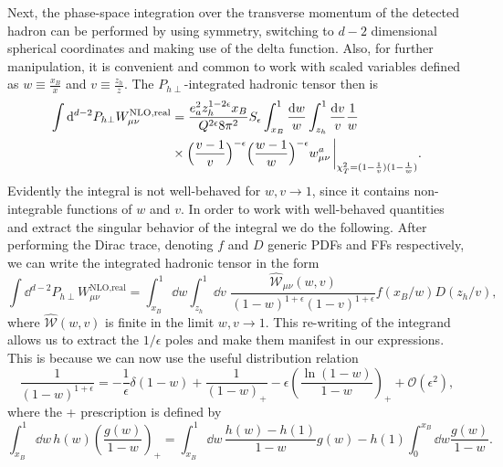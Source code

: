 Next, the phase-space integration over the transverse momentum of the detected hadron can be performed by using symmetry, switching to $d-2$ dimensional spherical coordinates and making use of the delta function. Also, for further manipulation, it is convenient and common to work with scaled variables defined as $w\equiv\frac{x_B}{x}$ and $ v\equiv\frac{z_h}{z}$. The $P_{h\perp}$-integrated hadronic tensor then is
\begin{equation}
    \begin{aligned}
         \int \dd^{d-2}P_{h\perp} W_{\mu\nu}^{\text{NLO,real}}&=\frac{e_a^2z_h^{1-2\epsilon} x_B}{Q^{2\epsilon}8\pi^2}S_\epsilon    \int_{x_B}^{1} \frac{\dd w}{w}\int_{z_h}^{1}  \frac{\dd v}{v}\frac{1}{w}\\
         &\times\Big(\frac{v-1}{v} \Big)^{-\epsilon}\Big(\frac{w-1}{w}\Big)^{-\epsilon}w_{\mu\nu}^a\eval_{\chi_T^2=(1-\frac{1}{v})(1-\frac{1}{w})}  .
    \end{aligned}
\end{equation}
Evidently the integral is not well-behaved for $w,v\to 1$, since it contains non-integrable functions of $w$ and $v$. In order to work with well-behaved quantities and extract the singular behavior of the integral we do the following. After performing the Dirac trace, denoting $f$ and $D$ generic PDFs and FFs respectively, we can write the integrated hadronic tensor in the form
\begin{equation}
    \int \dd^{d-2}P_{h\perp} W_{\mu\nu}^{\text{NLO,real}}= \int_{x_B}^{1} \dd w\int_{z_h}^{1} \dd v \,\,\frac{\hat{\mathcal{W}}_{\mu\nu}(w,v)}{(1-w)^{1+\epsilon}(1-v)^{1+\epsilon}}f(x_B/w)D(z_h/v),
\end{equation}
where $\hat{\mathcal{W}}(w,v)$ is finite in the limit $w,v\to 1$. This re-writing of the integrand allows us to extract the $1/\epsilon$ poles and make them manifest in our expressions. This is because we can now use the useful distribution relation \cite{Schwartz:2014sze}
\begin{equation}
    \frac{1}{(1-w)^{1+\epsilon}}=-\frac{1}{\epsilon}\delta(1-w) + \frac{1}{(1-w)_+}-\epsilon\left(\frac{\ln(1-w)}{1-w}\right)_+ + \mathcal{O}(\epsilon^2),
\end{equation}
where the + prescription is defined by \cite{handbookqcdsterman95}
\begin{equation}
    \int_{x_B}^1 \dd w \,h(w)\left(\frac{g(w)}{1-w}\right)_+=\int _{x_B}^1\dd w \,\frac{h(w)-h(1)}{1-w}g(w) - h(1)\int_0^{x_B}\dd w \frac{g(w)}{1-w}.
\end{equation}
